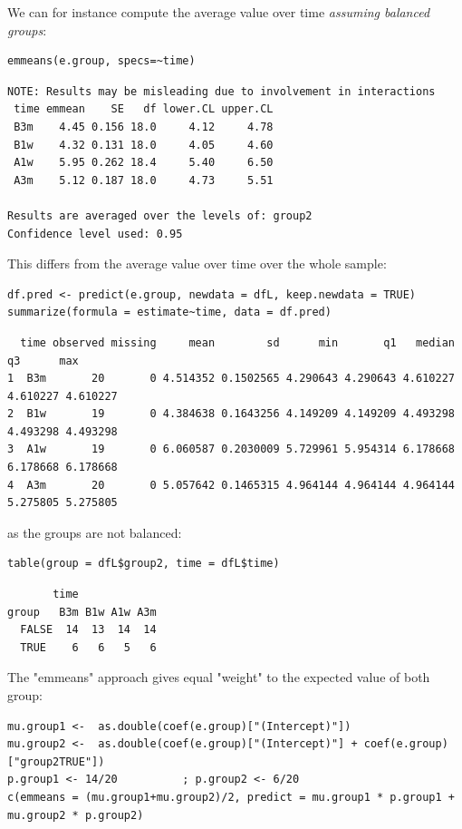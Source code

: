 \documentclass[12pt]{article}
\begin{document}
We can for instance compute the average value over time \emph{assuming balanced groups}:
\lstset{language=r,label= ,caption= ,captionpos=b,numbers=none}
\begin{lstlisting}
emmeans(e.group, specs=~time)
\end{lstlisting}

\begin{verbatim}
NOTE: Results may be misleading due to involvement in interactions
 time emmean    SE   df lower.CL upper.CL
 B3m    4.45 0.156 18.0     4.12     4.78
 B1w    4.32 0.131 18.0     4.05     4.60
 A1w    5.95 0.262 18.4     5.40     6.50
 A3m    5.12 0.187 18.0     4.73     5.51

Results are averaged over the levels of: group2 
Confidence level used: 0.95
\end{verbatim}


This differs from the average value over time over the whole sample:
\lstset{language=r,label= ,caption= ,captionpos=b,numbers=none}
\begin{lstlisting}
df.pred <- predict(e.group, newdata = dfL, keep.newdata = TRUE)
summarize(formula = estimate~time, data = df.pred)
\end{lstlisting}

\begin{verbatim}
  time observed missing     mean        sd      min       q1   median       q3      max
1  B3m       20       0 4.514352 0.1502565 4.290643 4.290643 4.610227 4.610227 4.610227
2  B1w       19       0 4.384638 0.1643256 4.149209 4.149209 4.493298 4.493298 4.493298
3  A1w       19       0 6.060587 0.2030009 5.729961 5.954314 6.178668 6.178668 6.178668
4  A3m       20       0 5.057642 0.1465315 4.964144 4.964144 4.964144 5.275805 5.275805
\end{verbatim}


as the groups are not balanced:
\lstset{language=r,label= ,caption= ,captionpos=b,numbers=none}
\begin{lstlisting}
table(group = dfL$group2, time = dfL$time)
\end{lstlisting}

\begin{verbatim}
       time
group   B3m B1w A1w A3m
  FALSE  14  13  14  14
  TRUE    6   6   5   6
\end{verbatim}


The "emmeans" approach gives equal "weight" to the expected value of
both group:
\lstset{language=r,label= ,caption= ,captionpos=b,numbers=none}
\begin{lstlisting}
mu.group1 <-  as.double(coef(e.group)["(Intercept)"])
mu.group2 <-  as.double(coef(e.group)["(Intercept)"] + coef(e.group)["group2TRUE"])
p.group1 <- 14/20          ; p.group2 <- 6/20
c(emmeans = (mu.group1+mu.group2)/2, predict = mu.group1 * p.group1 + mu.group2 * p.group2)
\end{lstlisting}
\end{document}

